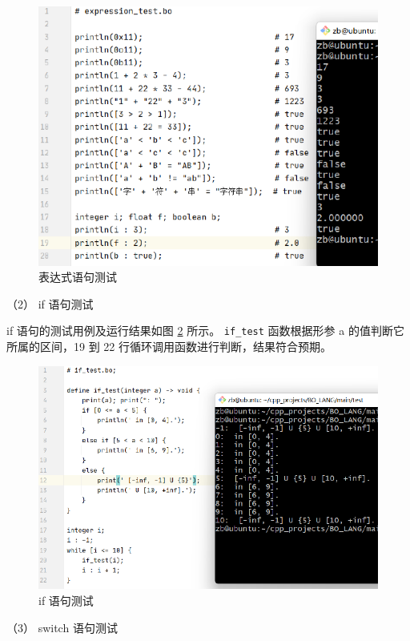 \begin{figure}[H]
    \centering\includegraphics{figure/test_expression.pdf}
    \caption{表达式语句测试}
    \label{fig_test_expression}
\end{figure}


（2） if 语句测试

if 语句的测试用例及运行结果如图 \ref{fig_test_if} 所示。 \verb|if_test| 函数根据形参 a 的值判断它所属的区间，19 到 22 行循环调用函数进行判断，结果符合预期。

\begin{figure}[H]
    \centering\includegraphics{figure/test_if.pdf}
    \caption{if 语句测试}
    \label{fig_test_if}
\end{figure}

（3） switch 语句测试

